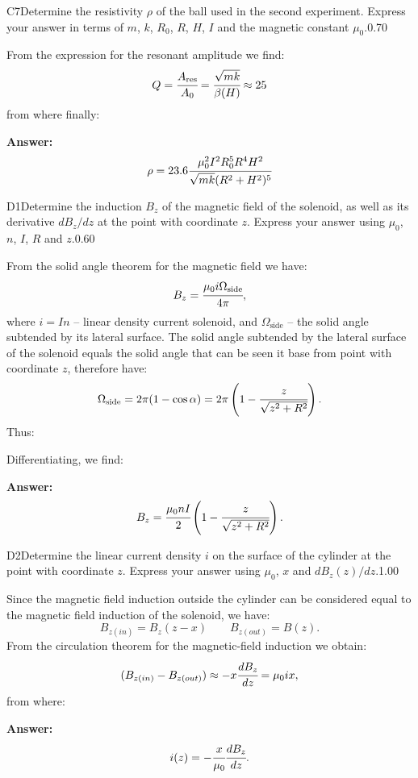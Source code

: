 \documentclass[11pt,a4paper]{article}
\begin{document}
\begin{solcard}{C7}{Determine the resistivity $\rho$ of the ball used in the second experiment. Express your answer in terms of $m$, $k$, $R_0$, $R$, $H$, $I$ and the magnetic constant $\mu_0$.}{0.70}

From the expression for the resonant amplitude we find: $$Q=\cfrac{A_\text{res}}{A_0}=\cfrac{\sqrt{mk}}{\beta(H)}\approx 25 $$from where finally:

\par\smallskip\noindent\textbf{Answer:} $$\rho=23{.}6\cfrac{\mu^2_0I^2R^5_0R^4H^2}{\sqrt{mk}(R^2+H^2)^5} $$
\end{solcard}

\begin{solcard}{D1}{Determine the induction $B_z$ of the magnetic field of the solenoid, as well as its derivative $dB_z/dz$ at the point with coordinate $z$. Express your answer using $\mu_0$, $n$, $I$, $R$ and $z$.}{0.60}

From the solid angle theorem for the magnetic field we have: $$B_z=\cfrac{\mu_0i\Omega_\text{side}}{4\pi}{,} $$where $i=In$ – linear density current solenoid, and $\Omega_\text{side}$ – the solid angle subtended by its lateral surface. The solid angle subtended by the lateral surface of the solenoid equals the solid angle that can be seen it base from point with coordinate $z$, therefore have: $$\Omega_\text{side}=2\pi(1-\cos\alpha)=2\pi\left(1-\cfrac{z}{\sqrt{z^2+R^2}}\right){.} $$Thus:


Differentiating, we find:

\par\smallskip\noindent\textbf{Answer:} $$B_z=\cfrac{\mu_0nI}{2}\left(1-\cfrac{z}{\sqrt{z^2+R^2}}\right){.} $$
\end{solcard}

\begin{solcard}{D2}{Determine the linear current density $i$ on the surface of the cylinder at the point with coordinate $z$. Express your answer using $\mu_0$, $x$ and $dB_z(z)/dz$.}{1.00}

Since the magnetic field induction outside the cylinder can be considered equal to the magnetic field induction of the solenoid, we have: $$B_{z(in)}=B_z(z-x)\qquad B_{z(out)}=B(z){.} $$From the circulation theorem for the magnetic-field induction we obtain: $$(B_{z(in)}-B_{z(out)})\approx -x\cfrac{dB_z}{dz}=\mu_0ix{,} $$from where:

\par\smallskip\noindent\textbf{Answer:} $$i(z)=-\cfrac{x}{\mu_0}\cfrac{dB_z}{dz}{.} $$
\end{solcard}
\end{document}
